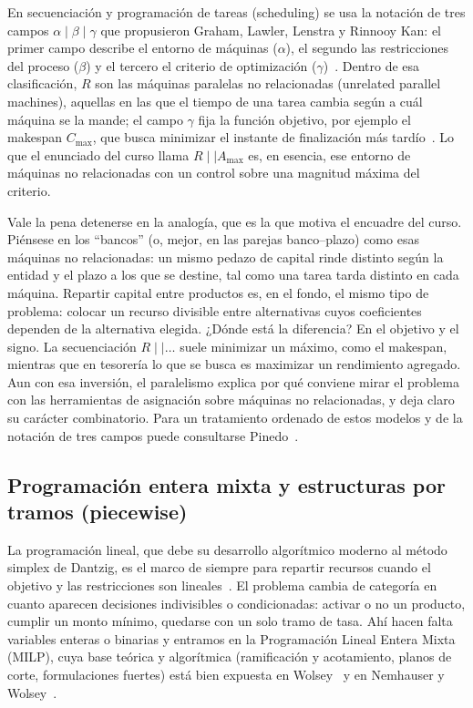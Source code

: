 \documentclass[11pt,a4paper]{article}
\begin{document}
En secuenciación y programación de tareas (scheduling) se usa la notación de tres campos
$\alpha \mid \beta \mid \gamma$ que propusieron Graham, Lawler, Lenstra y Rinnooy Kan: el
primer campo describe el entorno de máquinas ($\alpha$), el segundo las restricciones del
proceso ($\beta$) y el tercero el criterio de optimización ($\gamma$)~\citep{graham1979}. Dentro de esa
clasificación, $R$ son las máquinas paralelas no relacionadas (unrelated parallel machines),
aquellas en las que el tiempo de una tarea cambia según a cuál máquina se la mande; el campo
$\gamma$ fija la función objetivo, por ejemplo el makespan $C_{\max}$, que busca minimizar el
instante de finalización más tardío~\citep{pinedo2016}. Lo que el enunciado del curso llama $R \mid\mid
A_{\max}$ es, en esencia, ese entorno de máquinas no relacionadas con un control sobre una
magnitud máxima del criterio.

Vale la pena detenerse en la analogía, que es la que motiva el encuadre del curso. Piénsese
en los ``bancos'' (o, mejor, en las parejas banco--plazo) como esas máquinas no relacionadas:
un mismo pedazo de capital rinde distinto según la entidad y el plazo a los que se destine, tal
como una tarea tarda distinto en cada máquina. Repartir capital entre productos es, en el
fondo, el mismo tipo de problema: colocar un recurso divisible entre alternativas cuyos
coeficientes dependen de la alternativa elegida. ¿Dónde está la diferencia? En el objetivo y el
signo. La secuenciación $R \mid\mid \ldots$ suele minimizar un máximo, como el makespan,
mientras que en tesorería lo que se busca es maximizar un rendimiento agregado. Aun con esa
inversión, el paralelismo explica por qué conviene mirar el problema con las herramientas de
asignación sobre máquinas no relacionadas, y deja claro su carácter combinatorio. Para un
tratamiento ordenado de estos modelos y de la notación de tres campos puede consultarse
Pinedo~\citep{pinedo2016}.

\subsection{Programación entera mixta y estructuras por tramos (piecewise)}

La programación lineal, que debe su desarrollo algorítmico moderno al método simplex de
Dantzig, es el marco de siempre para repartir recursos cuando el objetivo y las restricciones
son lineales~\citep{dantzig1963}. El problema cambia de categoría en cuanto aparecen decisiones indivisibles o
condicionadas: activar o no un producto, cumplir un monto mínimo, quedarse con un solo tramo de
tasa. Ahí hacen falta variables enteras o binarias y entramos en la Programación Lineal Entera
Mixta (MILP), cuya base teórica y algorítmica (ramificación y acotamiento, planos de corte,
formulaciones fuertes) está bien expuesta en Wolsey~\citep{wolsey1998} y en Nemhauser y Wolsey~\citep{nemhauser1988}.
\end{document}

